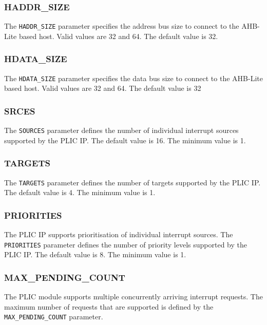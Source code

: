 \documentclass[]{article}
\begin{document}
\subsubsection{HADDR\_SIZE}

The \texttt{HADDR\_SIZE} parameter specifies the address bus size to
connect to the AHB-Lite based host. Valid values are 32 and 64. The
default value is 32.

\subsubsection{HDATA\_SIZE}

The \texttt{HDATA\_SIZE} parameter specifies the data bus size to
connect to the AHB-Lite based host. Valid values are 32 and 64. The
default value is 32

\hypertarget{SOURCES}{\subsubsection{SRCES}\label{sec:SOURCES}}

The \texttt{SOURCES} parameter defines the number of individual
interrupt sources supported by the PLIC IP. The default value is 16. The
minimum value is 1.

\hypertarget{TARGETS}{\subsubsection{TARGETS}\label{sec:TARGETS}}

The \texttt{TARGETS} parameter defines the number of targets supported
by the PLIC IP. The default value is 4. The minimum value is 1.

\subsubsection{PRIORITIES}

\sloppy
The PLIC IP supports prioritisation of individual interrupt sources. The \texttt{PRIORITIES} parameter defines the number of priority levels supported by the PLIC IP. The default value is 8. The minimum value is 1.

\subsubsection{MAX\_PENDING\_COUNT}

\sloppy
The PLIC module supports multiple concurrently arriving interrupt
requests. The maximum number of requests that are supported is defined
by the \texttt{MAX\_PENDING\_COUNT} parameter.
\end{document}
